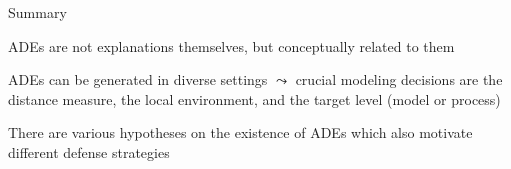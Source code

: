 \documentclass[10pt,compress,t,notes=noshow, xcolor=table]{beamer}
\begin{document}
\begin{framev}[align=top]{Summary}
\begin{itemizeM}
\item ADEs are not explanations themselves, but conceptually related to them
\item ADEs can be generated in diverse settings $\leadsto$ crucial modeling decisions are the distance measure, the local environment, and the target level (model or process)
\item There are various hypotheses on the existence of ADEs which also motivate different defense strategies
\end{itemizeM}
\spacer[0.25]
{\centering {}\par}
\end{framev}



\endlecture
\end{document}
